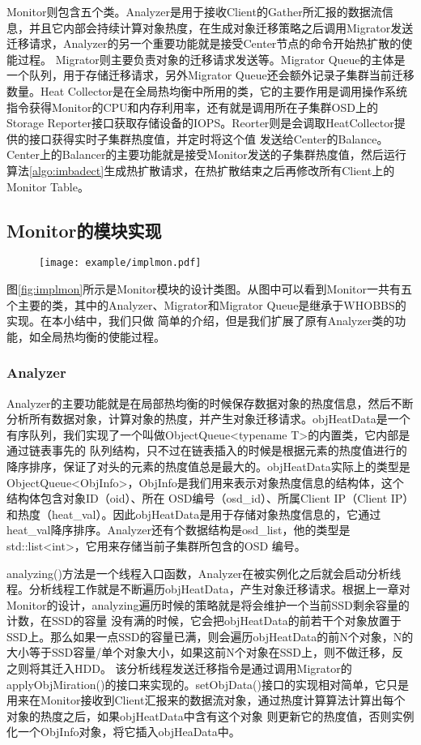 Monitor则包含五个类。Analyzer是用于接收Client的Gather所汇报的数据流信息，并且它内部会持续计算对象热度，在生成对象迁移策略之后调用Migrator发送迁移请求，Analyzer的另一个重要功能就是接受Center节点的命令开始热扩散的使能过程。
Migrator则主要负责对象的迁移请求发送等。Migrator Queue的主体是一个队列，用于存储迁移请求，另外Migrator Queue还会额外记录子集群当前迁移数量。Heat Collector是在全局热均衡中所用的类，它的主要作用是调用操作系统
指令获得Monitor的CPU和内存利用率，还有就是调用所在子集群OSD上的Storage Reporter接口获取存储设备的IOPS。Reorter则是会调取HeatCollector提供的接口获得实时子集群热度值，并定时将这个值
发送给Center的Balance。Center上的Balancer的主要功能就是接受Monitor发送的子集群热度值，然后运行算法\ref{algo:imbadect}生成热扩散请求，在热扩散结束之后再修改所有Client上的Monitor Table。


\subsection{Monitor的模块实现}
\begin{figure}[!htp]
    \centering
    \texttt{[image: example/implmon.pdf]}
\end{figure}

图\ref{fig:implmon}所示是Monitor模块的设计类图。从图中可以看到Monitor一共有五个主要的类，其中的Analyzer、Migrator和Migrator Queue是继承于WHOBBS的实现\cite{lingxuan2015whobbs}。在本小结中，我们只做
简单的介绍，但是我们扩展了原有Analyzer类的功能，如全局热均衡的使能过程。

\subsubsection{Analyzer}
Analyzer的主要功能就是在局部热均衡的时候保存数据对象的热度信息，然后不断分析所有数据对象，计算对象的热度，并产生对象迁移请求。objHeatData是一个有序队列，我们实现了一个叫做ObjectQueue<typename T>的内置类，它内部是通过链表事先的
队列结构，只不过在链表插入的时候是根据元素的热度值进行的降序排序，保证了对头的元素的热度值总是最大的。objHeatData实际上的类型是ObjectQueue<ObjInfo>，ObjInfo是我们用来表示对象热度信息的结构体，这个结构体包含对象ID（oid）、所在
OSD编号（osd\_id）、所属Client IP（Client IP）和热度（heat\_val）。因此objHeatData是用于存储对象热度信息的，它通过heat\_val降序排序。Analyzer还有个数据结构是osd\_list，他的类型是std::list<int>，它用来存储当前子集群所包含的OSD
编号。

analyzing()方法是一个线程入口函数，Analyzer在被实例化之后就会启动分析线程。分析线程工作就是不断遍历objHeatData，产生对象迁移请求。根据上一章对Monitor的设计，analyzing遍历时候的策略就是将会维护一个当前SSD剩余容量的计数，在SSD的容量
没有满的时候，它会把objHeatData的前若干个对象放置于SSD上。那么如果一点SSD的容量已满，则会遍历objHeatData的前N个对象，N的大小等于SSD容量/单个对象大小，如果这前N个对象在SSD上，则不做迁移，反之则将其迁入HDD\cite{lingxuan2015whobbs}。
该分析线程发送迁移指令是通过调用Migrator的applyObjMiration()的接口来实现的。setObjData()接口的实现相对简单，它只是用来在Monitor接收到Client汇报来的数据流对象，通过热度计算算法计算出每个对象的热度之后，如果objHeatData中含有这个对象
则更新它的热度值，否则实例化一个ObjInfo对象，将它插入objHeaData中。

